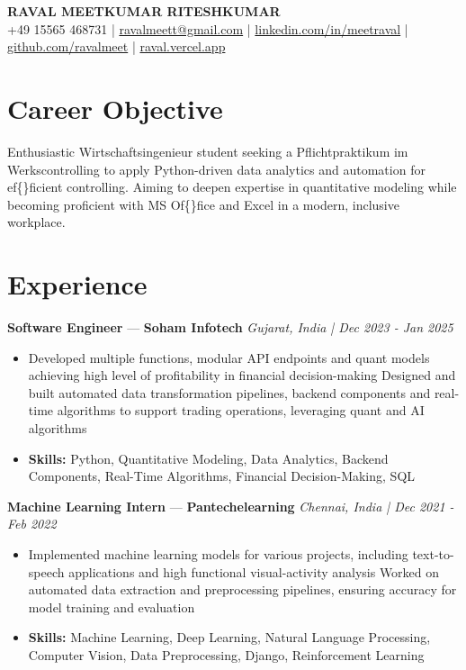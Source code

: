 \documentclass[a4paper,10pt]{article}
\begin{document}
\begin{center}
  {\Large\bfseries RAVAL MEETKUMAR RITESHKUMAR}\\[2pt]
  {\small +49 15565 468731 \;|\; \href{mailto:ravalmeett@gmail.com}{ravalmeett@gmail.com} \;|\; \href{https://www.linkedin.com/in/meetraval/}{linkedin.com/in/meetraval} \;|\; \href{https://github.com/ravalmeet}{github.com/ravalmeet} \;|\; \href{https://raval.vercel.app/}{raval.vercel.app}}
\end{center}
\vspace{-3pt}

\section*{Career Objective}
Enthusiastic Wirtschaftsingenieur student seeking a Pflichtpraktikum im Werkscontrolling to apply Python-driven data analytics and automation for ef\{\}ficient controlling. Aiming to deepen expertise in quantitative modeling while becoming proficient with MS Of\{\}fice and Excel in a modern, inclusive workplace.\par

\section*{Experience}
\textbf{Software Engineer} — \textbf{Soham Infotech} \hfill \textit{Gujarat, India \;|\; Dec 2023 - Jan 2025}\par
\vspace{1pt}
\begin{itemize}
  \item Developed multiple functions, modular API endpoints and quant models achieving high level of profitability in financial decision-making Designed and built automated data transformation pipelines, backend components and real-time algorithms to support trading operations, leveraging quant and AI algorithms
  \item \textbf{Skills:} Python, Quantitative Modeling, Data Analytics, Backend Components, Real-Time Algorithms, Financial Decision-Making, SQL
\end{itemize}
\vspace{3pt}
\textbf{Machine Learning Intern} — \textbf{Pantechelearning} \hfill \textit{Chennai, India \;|\; Dec 2021 - Feb 2022}\par
\vspace{1pt}
\begin{itemize}
  \item Implemented machine learning models for various projects, including text-to-speech applications and high functional visual-activity analysis Worked on automated data extraction and preprocessing pipelines, ensuring accuracy for model training and evaluation
  \item \textbf{Skills:} Machine Learning, Deep Learning, Natural Language Processing, Computer Vision, Data Preprocessing, Django, Reinforcement Learning
\end{itemize}
\end{document}
